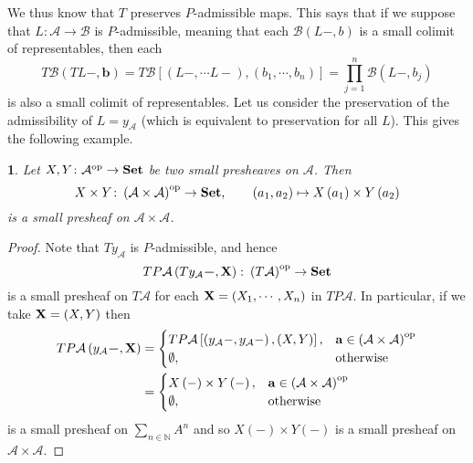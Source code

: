 \documentclass[a4paper,oneside,english]{amsart}
\numberwithin{equation}{section}
\numberwithin{figure}{section}
\theoremstyle{plain}
\theoremstyle{definition}
\theoremstyle{remark}
\theoremstyle{definition}
\theoremstyle{plain}
\newtheorem{prop}[thm]{\protect\propositionname}
\theoremstyle{plain}
\theoremstyle{plain}
\providecommand{\propositionname}{Proposition}
\begin{document}
We thus know that $T$ preserves $P$-admissible maps. This says that
if we suppose that $L\colon\mathcal{A}\to\mathcal{B}$ is $P$-admissible,
meaning that each $\mathcal{B}\left(L-,b\right)$ is a small colimit
of representables, then each 
\[
T\mathcal{B}\left(TL\boldsymbol{-},\mathbf{b}\right)=T\mathcal{B}\left[\left(L-,\cdots L-\right),\left(b_{1},\cdots,b_{n}\right)\right]=\prod_{j=1}^{n}\mathcal{B}\left(L-,b_{j}\right)
\]
 is also a small colimit of representables. Let us consider the preservation
of the admissibility of $L=y_{\mathcal{A}}$ (which is equivalent
to preservation for all $L$). This gives the following example.
\begin{prop}
Let $X,Y\colon\mathcal{A}^{\textnormal{op}}\to\mathbf{Set}$ be two
small presheaves on $\mathcal{A}$. Then 
\[
X\times Y\colon\left(\mathcal{A}\times\mathcal{A}\right)^{\textnormal{op}}\to\mathbf{Set},\qquad\left(a_{1},a_{2}\right)\mapsto X\left(a_{1}\right)\times Y\left(a_{2}\right)
\]
is a small presheaf on $\mathcal{A}\times\mathcal{A}$.\end{prop}
\begin{proof}
Note that $Ty_{\mathcal{A}}$ is $P$-admissible, and hence 
\[
TP\mathcal{A}\left(Ty_{\mathcal{A}}\boldsymbol{-},\mathbf{X}\right)\colon\left(T\mathcal{A}\right)^{\textnormal{op}}\to\mathbf{Set}
\]
 is a small presheaf on $T\mathcal{A}$ for each $\mbox{\ensuremath{\mathbf{X}}}=\left(X_{1},\cdots,X_{n}\right)$
in $TP\mathcal{A}$. In particular, if we take $\mbox{\ensuremath{\mathbf{X}}}=\left(X,Y\right)$
then
\[
\begin{aligned}TP\mathcal{A}\left(y_{\mathcal{A}}\boldsymbol{-},\mathbf{X}\right) & =\begin{cases}
TP\mathcal{A}\left[\left(y_{\mathcal{A}}-,y_{\mathcal{A}}-\right),\left(X,Y\right)\right], & \mathbf{a}\in\left(\mathcal{A}\times\mathcal{A}\right)^{\textnormal{op}}\\
\emptyset, & \textnormal{otherwise}
\end{cases}\\
 & =\begin{cases}
X\left(-\right)\times Y\left(-\right), & \mathbf{a}\in\left(\mathcal{A}\times\mathcal{A}\right)^{\textnormal{op}}\\
\emptyset, & \textnormal{otherwise}
\end{cases}
\end{aligned}
\]
is a small presheaf on $\sum_{n\in\mathbb{N}}A^{n}$ and so $X\left(-\right)\times Y\left(-\right)$
is a small presheaf on $\mathcal{A}\times\mathcal{A}$.
\end{proof}
\end{document}
